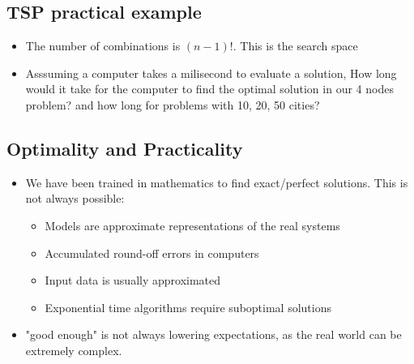   \subsection{TSP practical example}
  \begin{itemize}
    \item The number of combinations is $(n-1)!$. This is the search space
    \item Asssuming a computer takes a milisecond to evaluate a solution, How long would it take for the computer to find the optimal solution in our 4 nodes problem? and how long for problems with 10, 20, 50 cities?
  \end{itemize}


  \subsection{Optimality and Practicality}
  \begin{itemize}
    \item We have been trained in mathematics to find exact/perfect solutions. This is not always possible:
    \begin{itemize}
      \item Models are approximate representations of the real systems
      \item Accumulated round-off errors in computers
      \item Input data is usually approximated
      \item Exponential time algorithms require suboptimal solutions
    \end{itemize}
    \item "good enough" is not always lowering expectations, as the real world can be extremely complex.
  \end{itemize}


